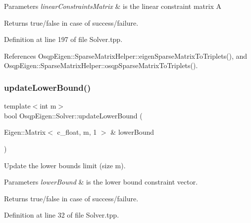 \begin{DoxyParams}{Parameters}
{\em linear\+Constraints\+Matrix} & is the linear constraint matrix A \\
\hline
\end{DoxyParams}
\begin{DoxyReturn}{Returns}
true/false in case of success/failure. 
\end{DoxyReturn}


Definition at line 197 of file Solver.\+tpp.



References Osqp\+Eigen\+::\+Sparse\+Matrix\+Helper\+::eigen\+Sparse\+Matrix\+To\+Triplets(), and Osqp\+Eigen\+::\+Sparse\+Matrix\+Helper\+::osqp\+Sparse\+Matrix\+To\+Triplets().

\mbox{\label{classOsqpEigen_1_1Solver_a48764153cec5e618021ab79586cc71b6}} 
\subsubsection{\texorpdfstring{update\+Lower\+Bound()}{updateLowerBound()}}
{\footnotesize\ttfamily template$<$int m$>$ \\
bool Osqp\+Eigen\+::\+Solver\+::update\+Lower\+Bound (\begin{DoxyParamCaption}\item[{Eigen\+::\+Matrix$<$ c\+\_\+float, m, 1 $>$ \&}]{lower\+Bound }\end{DoxyParamCaption})}



Update the lower bounds limit (size m). 


\begin{DoxyParams}{Parameters}
{\em lower\+Bound} & is the lower bound constraint vector. \\
\hline
\end{DoxyParams}
\begin{DoxyReturn}{Returns}
true/false in case of success/failure. 
\end{DoxyReturn}


Definition at line 32 of file Solver.\+tpp.

\mbox{\label{classOsqpEigen_1_1Solver_a69f1db45e10dae9c186cc0561532f018}} 
